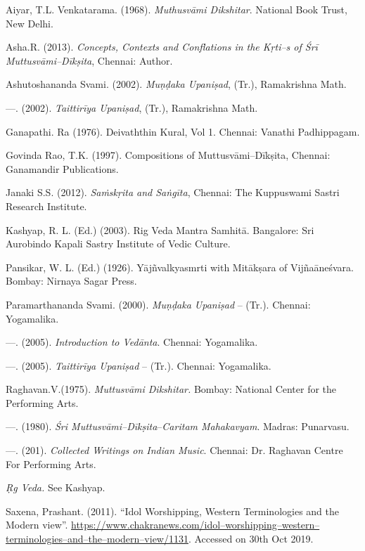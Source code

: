 \begin{thebibliography}{99}
 Aiyar, T.L. Venkatarama. (1968). \textit{Muthusvāmi Dikshitar}. National Book Trust, New Delhi.

  Asha.R. (2013). \textit{Concepts, Contexts and Conflations in the Kṛti–s of Śrī Muttusvāmi–Dīkṣita}, Chennai: Author.

  Ashutoshananda Svami. (2002). \textit{Muṇḍaka Upaniṣad}, (Tr.), Ramakrishna Math.

  —. (2002). \textit{Taittirīya Upaniṣad}, (Tr.), Ramakrishna Math.

  Ganapathi. Ra (1976). Deivaththin Kural, Vol 1. Chennai: Vanathi Padhippagam.

  Govinda Rao, T.K. (1997). Compositions of Muttusvāmi–Dīkṣita, Chennai: Ganamandir Publications.

  Janaki S.S. (2012). \textit{Saṁskṛita and Saṅgīta}, Chennai: The Kuppuswami Sastri Research Institute.

  Kashyap, R. L. (Ed.) (2003). Rig Veda Mantra Samhitā. Bangalore: Sri Aurobindo Kapali Sastry Institute of Vedic Culture.

  Pansikar, W. L. (Ed.) (1926). Yājñvalkyasmrti with Mitākṣara of Vijñaāneśvara. Bombay: Nirnaya Sagar Press.

  Paramarthananda Svami. (2000). \textit{Muṇḍaka Upaniṣad} – (Tr.). Chennai: Yogamalika.

  —. (2005). \textit{Introduction to Vedānta}. Chennai: Yogamalika.

  —. (2005). \textit{Taittirīya Upaniṣad} – (Tr.). Chennai: Yogamalika.

  Raghavan.V.(1975). \textit{Muttusvāmi Dikshitar.} Bombay: National Center for the Performing Arts.

  —. (1980). \textit{Śri Muttusvāmi–Dīkṣita}–\textit{Caritam Mahakavyam}. Madras: Punarvasu.

  —. (201). \textit{Collected Writings on Indian Music}. Chennai: Dr. Raghavan Centre For Performing Arts.

  \textit{Ṛg Veda.} See Kashyap.

  Saxena, Prashant. (2011). “Idol Worshipping, Western Terminologies and the Modern view”. \url{https://www.chakranews.com/idol–worshipping–western–terminologies–and–the–modern–view/1131}. Accessed on 30th Oct 2019.


\end{thebibliography}
